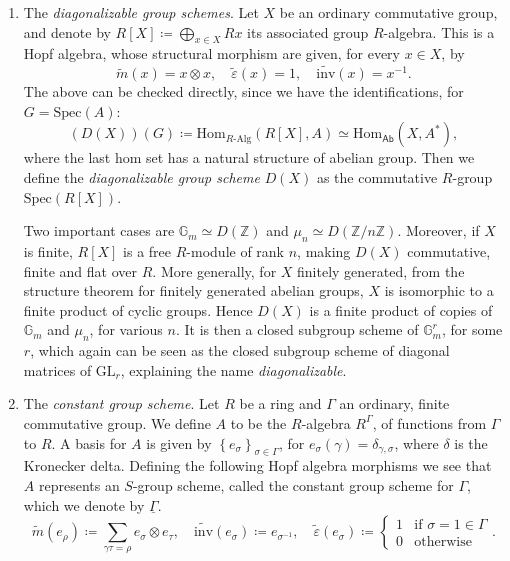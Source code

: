 \documentclass[../Main]{subfiles}
\begin{document}
\begin{ex}
\begin{enumerate}
		\item The {\em diagonalizable group schemes}. Let $X$ be an ordinary
			commutative group, and denote by $R[X] \coloneqq \bigoplus_{x \in X} Rx$
			its associated group $R$-algebra.
			This is a Hopf algebra, whose structural morphism
			are given, for every $x \in X$, by
			\begin{equation*}
				\widetilde{m}(x) = x \otimes x,
				\quad
				\widetilde{\varepsilon}(x) = 1,
				\quad
				\widetilde{\mathrm{inv}}(x) = x^{-1}
			.\end{equation*} 
			The above can be checked directly, since we have
			the identifications, for $G = \mathrm{Spec}(A)$:
			\begin{equation*}
				\left( D(X) \right)(G) \coloneqq
				\mathrm{Hom}_{R \text{-Alg}} \left( R[X], A \right) \simeq
				\mathrm{Hom}_{\mathsf{Ab}} \left( X, A^* \right)
			,\end{equation*} 
			where the last hom set has a natural structure of abelian
			group.
			Then we define the {\em diagonalizable group scheme} $D(X)$
			as the commutative $R$-group $\mathrm{Spec}(R[X])$.

			Two important cases are $\mathbb{G}_m \simeq D(\mathbb{Z})$
			and $\mu_n \simeq D(\mathbb{Z}/n\mathbb{Z})$.
			Moreover, if $X$ is finite, $R[X]$ is a free $R$-module of rank $n$,
			making $D(X)$ commutative, finite and flat over $R$.
			More generally, for $X$ finitely generated, 
			from the structure theorem for finitely generated abelian groups, 
			$X$ is isomorphic to a finite product of cyclic groups.
			Hence $D(X)$ is a finite product of copies of $\mathbb{G}_m$
			and $\mu_n$, for various $n$.
			It is then a closed subgroup scheme of $\mathbb{G}_m^r$, for some $r$,
			which again can be seen as the closed subgroup scheme of diagonal
			matrices of $\mathrm{GL}_r$, explaining the name 
			{\em diagonalizable}.


		\item The {\em constant group scheme}\label{ex:ConstantGroups}.
			Let $R$ be a ring and $\Gamma$ an ordinary, finite commutative group.
			We define $A$ to be the $R$-algebra $R^\Gamma$,
			of functions from $\Gamma$ to $R$.
			A basis for $A$ is given by $\left\{ e_\sigma \right\}_{\sigma \in \Gamma}$,
			for $e_\sigma(\gamma) = \delta_{\gamma,\sigma}$,
			where $\delta$ is the Kronecker delta.
			Defining the following Hopf algebra morphisms
			we see that $A$ represents an $S$-group scheme,
			called the constant group scheme for $\Gamma$,
			which we denote by $\underline{\Gamma}$.
			\begin{equation*}
				\widetilde{m}(e_\rho) \coloneqq
				\sum_{\gamma\tau = \rho}^{} e_\sigma \otimes e_\tau, 
				\quad
				\widetilde{\mathrm{inv}}(e_\sigma) \coloneqq e_{\sigma^{-1}}, 
				\quad
				\widetilde{\varepsilon}(e_\sigma) \coloneqq
				\begin{cases}
					1 & \text{if } \sigma = 1 \in \Gamma\\
					0 & \text{otherwise}
				\end{cases}.
			\end{equation*}



\end{enumerate}
\end{ex}
\end{document}
